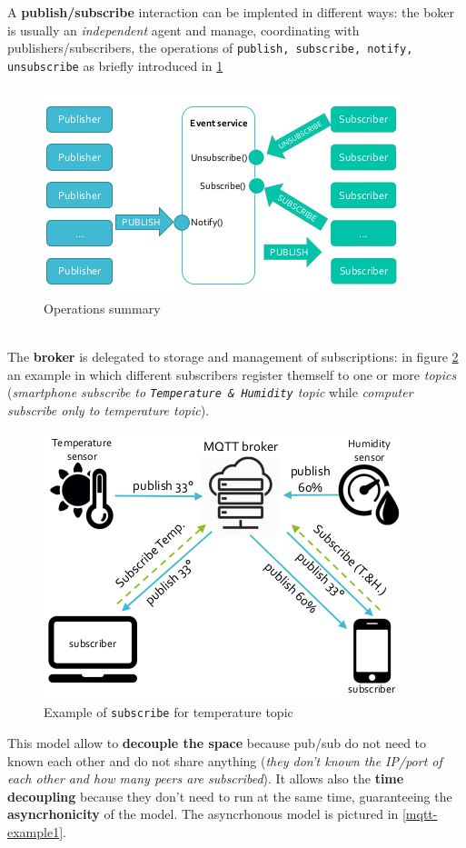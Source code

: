 \documentclass[10pt,a4paper]{report}
\theoremstyle{definition}
\begin{document}
A \textbf{publish/subscribe} interaction can be implented in different ways: the boker is usually an \textit{independent} agent and manage, coordinating with publishers/subscribers, the operations of \texttt{publish, subscribe, notify, unsubscribe} as briefly introduced in \ref{mqtt-op}
\begin{figure}[h!]
	\centering\includegraphics[scale=0.70]{images/Pasted image 20230301091322.png}
	\caption{Operations summary}\label{mqtt-op}
\end{figure}\\
The \textbf{broker} is delegated to storage and management of subscriptions: in figure \ref{mqtt-topic-sub} an example in which different subscribers register themself to one or more \textit{topics} (\textit{smartphone subscribe to \texttt{Temperature \& Humidity} topic} while \textit{computer subscribe only to temperature topic}).
\begin{figure}[h!]
	\centering\includegraphics[scale=0.60]{images/Pasted image 20230301091527.png}
	\caption{Example of \texttt{subscribe} for temperature topic}\label{mqtt-topic-sub}
\end{figure}
This model allow to \textbf{decouple the space} because pub/sub do not need to known each other and do not share anything (\textit{they don't known the IP/port of each other and how many peers are subscribed}). It allows also the \textbf{time decoupling} because they don't need to run at the same time, guaranteeing the \textbf{asyncrhonicity} of the model. The asyncrhonous model is pictured in \ref{mqtt-example1}.
\end{document}

